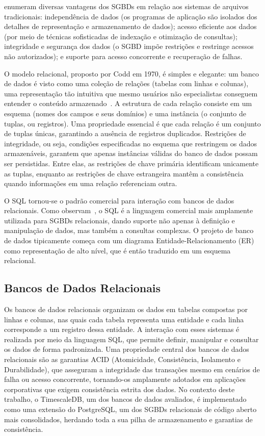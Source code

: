 \cite{Ramakrishnan2003} enumeram diversas vantagens dos SGBDs em relação aos sistemas de arquivos
tradicionais: independência de dados (os programas de aplicação são isolados dos detalhes de
representação e armazenamento de dados); acesso eficiente aos dados (por meio de técnicas
sofisticadas de indexação e otimização de consultas); integridade e segurança dos dados (o SGBD
impõe restrições e restringe acessos não autorizados); e suporte para acesso concorrente e
recuperação de falhas.

O modelo relacional, proposto por Codd em 1970, é simples e elegante: um banco de dados é visto
como uma coleção de relações (tabelas com linhas e colunas), uma representação tão intuitiva
que mesmo usuários não especialistas conseguem entender o conteúdo armazenado~\citep{Ramakrishnan2003}.
A estrutura de cada relação consiste em um esquema (nomes dos campos e seus domínios) e uma
instância (o conjunto de tuplas, ou registros). Uma propriedade essencial é que cada relação é
um conjunto de tuplas únicas, garantindo a ausência de registros duplicados. Restrições de
integridade, ou seja, condições especificadas no esquema que restringem os dados armazenáveis,
garantem que apenas instâncias válidas do banco de dados possam ser persistidas. Entre elas,
as restrições de chave primária identificam unicamente as tuplas, enquanto as restrições de
chave estrangeira mantêm a consistência quando informações em uma relação referenciam outra.

O SQL tornou-se o padrão comercial para interação com bancos de dados relacionais.
Como observam~\cite{Ramakrishnan2003}, o SQL é a linguagem comercial mais amplamente utilizada
para SGBDs relacionais, dando suporte não apenas à definição e manipulação de dados, mas também
a consultas complexas. O projeto de banco de dados tipicamente começa com um diagrama
Entidade-Relacionamento (ER) como representação de alto nível, que é então traduzido em um
esquema relacional.

\subsection{Bancos de Dados Relacionais}

Os bancos de dados relacionais organizam os dados em tabelas compostas por linhas e colunas,
nas quais cada tabela representa uma entidade e cada linha corresponde a um registro dessa
entidade. A interação com esses sistemas é realizada por meio da linguagem SQL, que permite
definir, manipular e consultar os dados de forma padronizada. Uma propriedade central dos
bancos de dados relacionais são as garantias ACID (Atomicidade, Consistência, Isolamento e
Durabilidade), que asseguram a integridade das transações mesmo em cenários de falha ou acesso
concorrente, tornando-os amplamente adotados em aplicações corporativas que exigem consistência
estrita dos dados. No contexto deste trabalho, o TimescaleDB, um dos bancos de dados avaliados,
é implementado como uma extensão do PostgreSQL, um dos SGBDs relacionais de código aberto mais
consolidados, herdando toda a sua pilha de armazenamento e garantias de consistência.


